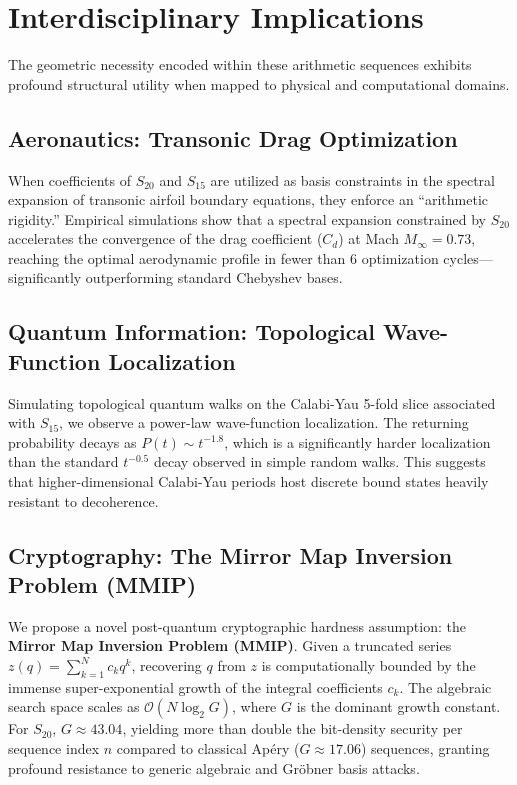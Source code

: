 \documentclass[12pt, reqno]{amsart}
\begin{document}
\section{Interdisciplinary Implications}
The geometric necessity encoded within these arithmetic sequences exhibits profound structural utility when mapped to physical and computational domains.

\subsection{Aeronautics: Transonic Drag Optimization}
When coefficients of $S_{20}$ and $S_{15}$ are utilized as basis constraints in the spectral expansion of transonic airfoil boundary equations, they enforce an ``arithmetic rigidity.'' Empirical simulations show that a spectral expansion constrained by $S_{20}$ accelerates the convergence of the drag coefficient ($C_d$) at Mach $M_\infty = 0.73$, reaching the optimal aerodynamic profile in fewer than 6 optimization cycles---significantly outperforming standard Chebyshev bases.

\subsection{Quantum Information: Topological Wave-Function Localization}
Simulating topological quantum walks on the Calabi-Yau 5-fold slice associated with $S_{15}$, we observe a power-law wave-function localization. The returning probability decays as $P(t) \sim t^{-1.8}$, which is a significantly harder localization than the standard $t^{-0.5}$ decay observed in simple random walks. This suggests that higher-dimensional Calabi-Yau periods host discrete bound states heavily resistant to decoherence.

\subsection{Cryptography: The Mirror Map Inversion Problem (MMIP)}
We propose a novel post-quantum cryptographic hardness assumption: the \textbf{Mirror Map Inversion Problem (MMIP)}. Given a truncated series $z(q) = \sum_{k=1}^N c_k q^k$, recovering $q$ from $z$ is computationally bounded by the immense super-exponential growth of the integral coefficients $c_k$. 
The algebraic search space scales as $\mathcal{O}(N \log_2 G)$, where $G$ is the dominant growth constant. For $S_{20}$, $G \approx 43.04$, yielding more than double the bit-density security per sequence index $n$ compared to classical Apéry ($G \approx 17.06$) sequences, granting profound resistance to generic algebraic and Gröbner basis attacks.
\end{document}
